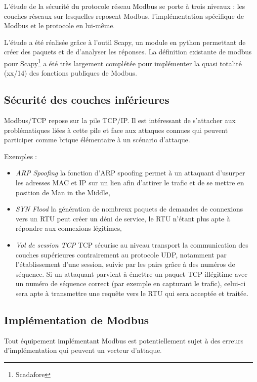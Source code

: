 \documentclass[10pt,a4paper]{article}
\begin{document}
	L'étude de la sécurité du protocole réseau Modbus se porte à trois niveaux : les couches réseaux sur lesquelles reposent Modbus, l'implémentation spécifique de Modbus et le protocole en lui-m\^eme.
	
	L'étude a été réalisée gr\^ace à l'outil Scapy, un module en python permettant de créer des paquets et de d'analyser les réponses. La définition existante de modbus pour Scapy\footnote{Scadafore} a été très largement complétée pour implémenter la quasi totalité (xx/14) des fonctions publiques de Modbus.
	
	\subsection{Sécurité des couches inférieures}
		
		Modbus/TCP repose sur la pile TCP/IP. Il est intéressant de s'attacher aux problématiques liées à cette pile et face aux attaques connues qui peuvent participer comme brique élémentaire à un scénario d'attaque.
		
		Exemples : 
		\begin{itemize}
		\item \textit{ARP Spoofing} la fonction d'ARP spoofing permet à un attaquant d'usurper les adresses MAC et IP sur un lien afin d'attirer le trafic et de se mettre en position de Man in the Middle,
		\item \textit{SYN Flood} la génération de nombreux paquets de demandes de connexions vers un RTU peut créer un déni de service, le RTU n'étant plus apte à répondre aux connexions légitimes,
		\item \textit{Vol de session TCP} TCP sécurise au niveau transport la communication des couches supérieures contrairement au protocole UDP, notamment par l'établissement d'une session, suivie par les pairs grâce à des numéros de séquence. Si un attaquant parvient à émettre un paquet TCP illégitime avec un numéro de séquence correct (par exemple en capturant le trafic), celui-ci sera apte à transmettre une requête vers le RTU qui sera acceptée et traitée.
		\end{itemize}
	
	\subsection{Implémentation de Modbus}
	
		Tout équipement implémentant Modbus est potentiellement sujet à des erreurs d'implémentation qui peuvent un vecteur d'attaque.
		
\end{document}
